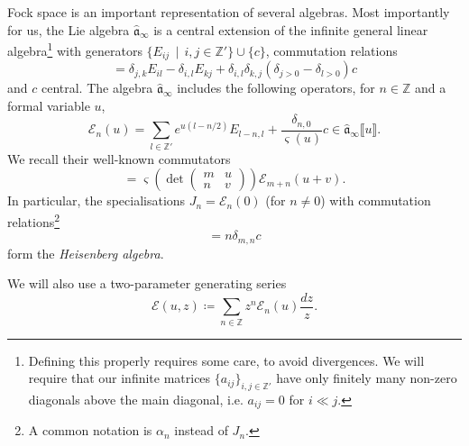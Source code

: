 \documentclass[10pt,a4paper,oneside,no-math,reqno]{amsart}%
\theoremstyle{plain}
\theoremstyle{definition}
\theoremstyle{remark}
\numberwithin{equation}{section}
\newcommand{\mb}[1]{\mathbb{#1}}
\newcommand{\mf}[1]{\mathfrak{#1}}
\newcommand{\mc}[1]{\mathcal{#1}}
\newcommand{\1}{\mathds{1}}
\newcommand{\Z}{\mb{Z}}
\newcommand{\<}{\langle}
\renewcommand{\>}{\rangle}
\begin{document}
Fock space is an important representation of several algebras.
Most importantly for us, the Lie algebra $ \widehat{\mf{a}}_\infty$ is a central extension of the infinite general linear algebra\footnote{Defining this properly requires some care, to avoid divergences. We will require that our infinite matrices $ \{ a_{ij} \}_{i,j \in \Z'} $ have only finitely many non-zero diagonals above the main diagonal, i.e. $ a_{ij} = 0 $ for $ i \ll j$.} with generators $ \{ E_{ij} \, \mid \, i, j \in \Z ' \} \cup \{ c\}$, commutation relations
\begin{equation}
    [ E_{ij}, E_{kl} ]
    =
    \delta_{j,k} E_{il} - \delta_{i,l} E_{kj} + \delta_{i,l} \delta_{k,j} (\delta_{j > 0} - \delta_{l > 0} ) c
\end{equation}
and $c$ central. The algebra $ \widehat{\mf{a}}_\infty$ includes the following operators, for $ n \in \Z $ and a formal variable $u$,
\begin{equation}
    \mathcal{E}_n(u)
    =
    \sum_{l\in\mathbb{Z}'}e^{u(l-n/2)}E_{l-n,l}+\frac{\delta_{n,0}}{\varsigma(u)} c 
    \in
    \widehat{\mf{a}}_\infty \llbracket u \rrbracket .
\end{equation}
We recall their well-known commutators
\begin{equation}
    [\mathcal{E}_m(u),\mathcal{E}_n(v)]
    =
    \varsigma\left(\det \begin{pmatrix}
        m & u\\n & v
    \end{pmatrix}\right) 
    \mc{E}_{m+n} (u+v).
\end{equation}
In particular, the specialisations $ J_n = \mathcal{E}_n(0)$ (for $ n \neq 0$) with commutation relations\footnote{A common notation is $ \alpha_n $ instead of $J_n$.}
\begin{equation}
    [J_m , J_n]
    =
    n \delta_{m,n} c
\end{equation}
form the \emph{Heisenberg algebra}.

We will also use a two-parameter generating series
\begin{equation}
    \mc{E}(u,z)
    \coloneqq
    \sum_{n \in \Z } z^n \mc{E}_n (u)\frac{dz}{z}.
\end{equation}
\end{document}
